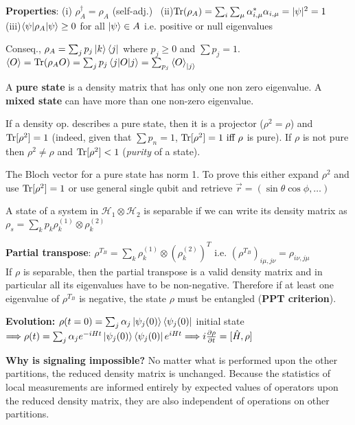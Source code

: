 \begin{squishlist}
    \item \textbf{Properties}: 
    (i) $\rho_A^{\dagger} = \rho_A$ (self-adj.) \, (ii)$\mathrm{Tr}(\rho_A) = \sum_i  \sum_{\mu}\alpha^*_{i,\mu}\alpha_{i,\mu} = |\psi|^2 = 1$ \\ (iii)$\braket{\psi|\rho_A|\psi} \geq 0$ for all $\ket{\psi} \in A$ i.e. positive or null eigenvalues
    \item Conseq., $\rho_A = \sum_j p_j \ket{k}\bra{j}$ where $p_j\geq 0$ and $\sum p_j = 1$.\\ $\braket{O} = \mathrm{Tr}(\rho_A O) = \sum_j p_j \braket{j|O|j} = \sum_{p_j} \braket{O}_{\ket{j}}$
    
    \item A \textbf{pure state} is a density matrix that has only one non zero eigenvalue. A \textbf{mixed state}
    can have more than one non-zero eigenvalue.
    \item If a density op. describes a pure state, then it is a projector ($\rho^2 = \rho$) and $\mathrm{Tr}[\rho^2] = 1$ (indeed, given that $\sum p_n = 1$, $\mathrm{Tr}[\rho^2] = 1 \text{ iff } \rho$ is pure). If $\rho$ is not pure then $\rho^2 \neq \rho$ and $\mathrm{Tr}[\rho^2] < 1$ (\emph{purity} of a state).

    \item The Bloch vector for a pure state has norm 1. To prove this either expand $\rho^2$ and use $\mathrm{Tr}[\rho^2] = 1$ or use general single qubit and retrieve $\vec{r} = (\sin \theta \cos \phi, \ldots)$
    
    \item A state of a system in $\mathcal{H}_1 \otimes \mathcal{H}_2$ is separable if we can write its density matrix as \\
    $\rho_s = \sum_k p_k \rho_k^{(1)} \otimes \rho_k^{(2)} $

    \item \textbf{Partial transpose}: $\rho^{T_B} = \sum_k \rho_k^{(1)} \otimes \left(\rho_k^{(2)}\right)^T$
    i.e. $(\rho^{T_B})_{i\mu,j\nu} = \rho_{i\nu,j\mu}$ \\
    If $\rho$ is separable, then the partial transpose is a valid density matrix and in particular all its eigenvalues have to be non-negative. Therefore if at least one eigenvalue of $\rho^{T_B}$ is negative, the state $\rho$ must be entangled (\textbf{PPT criterion}).


    \item \textbf{Evolution:} $\rho(t=0) = \sum_j \alpha_j \ket{\psi_j(0)}\bra{\psi_j(0)}$ initial state \\ $\Longrightarrow \rho(t) = \sum_j \alpha_j e^{-iHt} \ket{\psi_j(0)}\bra{\psi_j(0)}e^{iHt} \Longrightarrow i \frac{\partial \rho}{\partial t} = [\hat{H},\rho]$
    \item \textbf{Why is signaling impossible?} No matter what is performed upon the other partitions, the reduced density matrix is unchanged. Because the statistics of local measurements are informed entirely by expected values of operators upon the reduced density matrix, they are also independent of operations on other partitions.
\end{squishlist}

